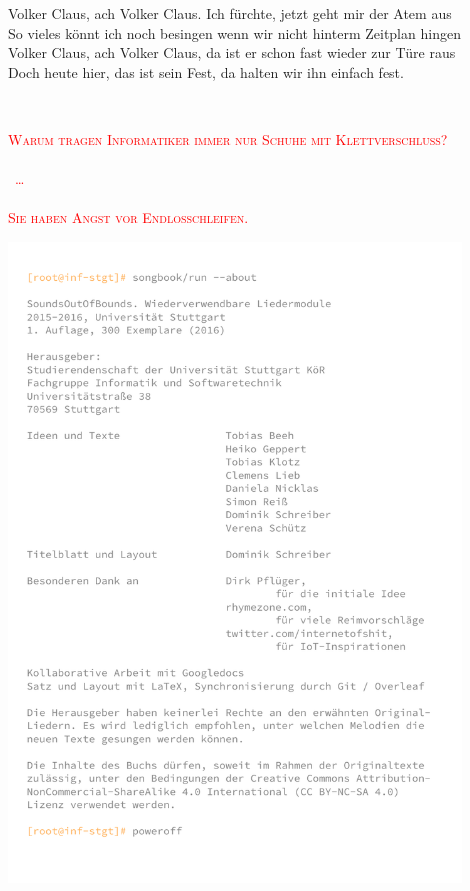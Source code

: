 \documentclass[11pt,a5paper]{article}
\newcommand\colorjoke{red}
\newcommand\refrain[1]{\begin{tcolorbox}#1\end{tcolorbox} \ }
\newcommand\joke[1]{\textcolor{\colorjoke}{\textsc{#1}}}
\begin{document}
\refrain{Volker Claus, ach Volker Claus. Ich fürchte, jetzt geht mir der Atem aus \\
So vieles könnt ich noch besingen wenn wir nicht hinterm Zeitplan hingen \\
Volker Claus, ach Volker Claus, da ist er schon fast wieder zur Türe raus \\
Doch heute hier, das ist sein Fest, da halten wir ihn einfach fest.}

\vspace*{4cm}

\begin{center}
	\joke{
		Warum tragen Informatiker immer nur Schuhe mit Klettverschluss? \\
		\ \\
		\ \ldots \\
		\ \\
		Sie haben Angst vor Endlosschleifen.}
\end{center}

\pagebreak

\vspace*{1.5cm}

\hfill\includegraphics[width=12cm]{hacker-cover-hinten.pdf}\hspace*{\fill}
\end{document}
